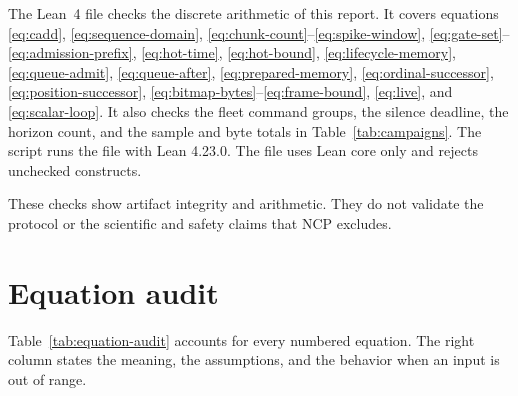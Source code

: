 \documentclass[11pt,a4paper]{article}
\theoremstyle{definition}
\begin{document}
The Lean~4 file  checks the discrete
arithmetic of this report. It covers equations \eqref{eq:cadd}, \eqref{eq:sequence-domain},
\eqref{eq:chunk-count}--\eqref{eq:spike-window},
\eqref{eq:gate-set}--\eqref{eq:admission-prefix}, \eqref{eq:hot-time},
\eqref{eq:hot-bound}, \eqref{eq:lifecycle-memory}, \eqref{eq:queue-admit},
\eqref{eq:queue-after}, \eqref{eq:prepared-memory}, \eqref{eq:ordinal-successor},
\eqref{eq:position-successor}, \eqref{eq:bitmap-bytes}--\eqref{eq:frame-bound},
\eqref{eq:live}, and \eqref{eq:scalar-loop}. It also checks the fleet command groups,
the silence deadline, the horizon count, and the sample and byte totals in
Table~\ref{tab:campaigns}. The script  runs the
file with Lean 4.23.0. The file uses Lean core only and rejects unchecked constructs.

These checks show artifact integrity and arithmetic. They do not validate the protocol
or the scientific and safety claims that NCP excludes.

\section{Equation audit}\label{app:audit}

Table~\ref{tab:equation-audit} accounts for every numbered equation. The right column
states the meaning, the assumptions, and the behavior when an input is out of range.
\end{document}
